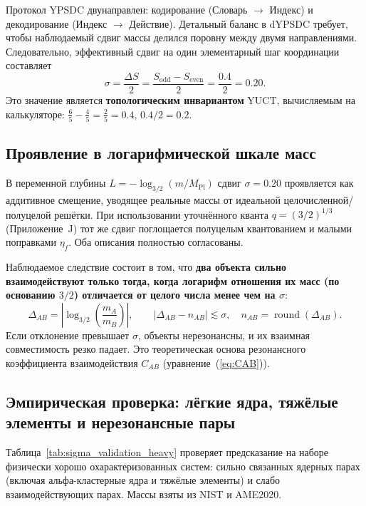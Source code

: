 \documentclass[11pt,a4paper]{article}
\theoremstyle{remark}
\begin{document}
	Протокол YPSDC двунаправлен: кодирование (Словарь \(\to\) Индекс) и декодирование (Индекс \(\to\) Действие). Детальный баланс в dYPSDC требует, чтобы наблюдаемый сдвиг массы делился поровну между двумя направлениями. Следовательно, эффективный сдвиг на один элементарный шаг координации составляет
	\begin{equation}
		\boxed{\sigma = \frac{\Delta S}{2} = \frac{S_{\mathrm{odd}} - S_{\mathrm{even}}}{2} = \frac{0.4}{2} = 0.20.}
		\label{eq:sigma}
	\end{equation}
	Это значение является \textbf{топологическим инвариантом} YUCT, вычисляемым на калькуляторе: \(\frac{6}{5} - \frac{4}{5} = \frac{2}{5} = 0.4\), \(0.4/2 = 0.2\).
	
	\subsection{Проявление в логарифмической шкале масс}
	
	В переменной глубины \(L = -\log_{3/2}(m/M_{\mathrm{Pl}})\) сдвиг \(\sigma = 0.20\) проявляется как аддитивное смещение, уводящее реальные массы от идеальной целочисленной/полуцелой решётки. При использовании уточнённого кванта \(q = (3/2)^{1/3}\) (Приложение~J) тот же сдвиг поглощается полуцелым квантованием и малыми поправками \(\eta_f\). Оба описания полностью согласованы.
	
	Наблюдаемое следствие состоит в том, что \textbf{два объекта сильно взаимодействуют только тогда, когда логарифм отношения их масс (по основанию \(3/2\)) отличается от целого числа менее чем на \(\sigma\)}:
	\begin{equation}
		\Delta_{AB} = \left| \log_{3/2}\!\left(\frac{m_A}{m_B}\right) \right|,\qquad |\Delta_{AB} - n_{AB}| \lesssim \sigma,\quad n_{AB} = \operatorname{round}(\Delta_{AB}).
	\end{equation}
	Если отклонение превышает \(\sigma\), объекты нерезонансны, и их взаимная совместимость резко падает. Это теоретическая основа резонансного коэффициента взаимодействия \(C_{AB}\) (уравнение~(\ref{eq:CAB})).
	
	\subsection{Эмпирическая проверка: лёгкие ядра, тяжёлые элементы и нерезонансные пары}
	
	Таблица~\ref{tab:sigma_validation_heavy} проверяет предсказание на наборе физически хорошо охарактеризованных систем: сильно связанных ядерных парах (включая альфа-кластерные ядра и тяжёлые элементы) и слабо взаимодействующих парах. Массы взяты из NIST и AME2020.
	
\end{document}

